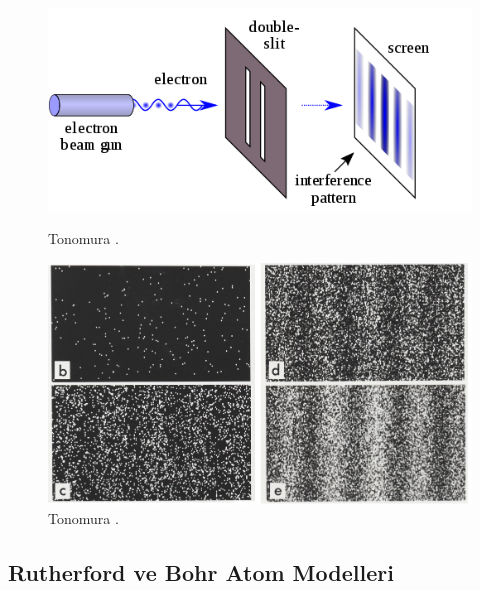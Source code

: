 \documentclass[a4paper,12pt, twoside]{article}
\begin{document}
\begin{figure}[hbtp]
\center
\begin{minipage}{0.45\textwidth}
\includegraphics[scale=.4]{Double-slit.png}
\caption{Tonomura \cite{web:wiki_double_slit_experiment}.}
\label{fig:tonomura}
\end{minipage}
\begin{minipage}{0.45\textwidth}
\includegraphics[scale=.8]{Double-slit_experiment_results_Tonomura_2.jpg}
\caption{Tonomura \cite{web:wiki_double_slit_experiment}.}
\label{fig:tonomura1}
\end{minipage}
\end{figure}

\newpage

\subsection{Rutherford ve Bohr Atom Modelleri}
\end{document}
